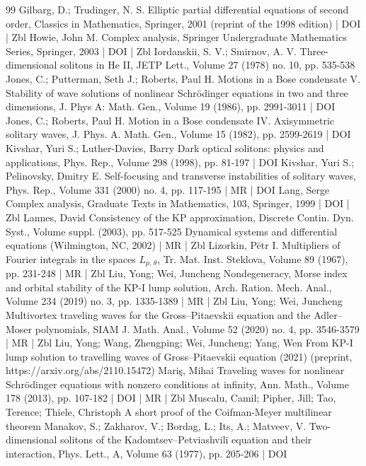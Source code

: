 \begin{thebibliography}{99}
Gilbarg, D.; Trudinger, N. S. Elliptic partial differential equations of second order, Classics in Mathematics, Springer, 2001 (reprint of the 1998 edition) | DOI | Zbl
Howie, John M. Complex analysis, Springer Undergraduate Mathematics Series, Springer, 2003 | DOI | Zbl
Iordanskii, S. V.; Smirnov, A. V. Three-dimensional solitons in He II, JETP Lett., Volume 27 (1978) no. 10, pp. 535-538
Jones, C.; Putterman, Seth J.; Roberts, Paul H. Motions in a Bose condensate V. Stability of wave solutions of nonlinear Schrödinger equations in two and three dimensions, J. Phys A: Math. Gen., Volume 19 (1986), pp. 2991-3011 | DOI
Jones, C.; Roberts, Paul H. Motion in a Bose condensate IV. Axisymmetric solitary waves, J. Phys. A. Math. Gen., Volume 15 (1982), pp. 2599-2619 | DOI
Kivshar, Yuri S.; Luther-Davies, Barry Dark optical solitons: physics and applications, Phys. Rep., Volume 298 (1998), pp. 81-197 | DOI
Kivshar, Yuri S.; Pelinovsky, Dmitry E. Self-focusing and transverse instabilities of solitary waves, Phys. Rep., Volume 331 (2000) no. 4, pp. 117-195 | MR | DOI
Lang, Serge Complex analysis, Graduate Texts in Mathematics, 103, Springer, 1999 | DOI | Zbl
Lannes, David Consistency of the KP approximation, Discrete Contin. Dyn. Syst., Volume suppl. (2003), pp. 517-525 Dynamical systems and differential equations (Wilmington, NC, 2002) | MR | Zbl
Lizorkin, Pëtr I. Multipliers of Fourier integrals in the spaces ${L}_{p,\,\theta }$, Tr. Mat. Inst. Steklova, Volume 89 (1967), pp. 231-248 | MR | Zbl
Liu, Yong; Wei, Juncheng Nondegeneracy, Morse index and orbital stability of the KP-I lump solution, Arch. Ration. Mech. Anal., Volume 234 (2019) no. 3, pp. 1335-1389 | MR | Zbl
Liu, Yong; Wei, Juncheng Multivortex traveling waves for the Gross–Pitaevskii equation and the Adler–Moser polynomials, SIAM J. Math. Anal., Volume 52 (2020) no. 4, pp. 3546-3579 | MR | Zbl
Liu, Yong; Wang, Zhengping; Wei, Juncheng; Yang, Wen From KP-I lump solution to travelling waves of Gross–Pitaevskii equation (2021) (preprint, https://arxiv.org/abs/2110.15472)
Mariş, Mihai Traveling waves for nonlinear Schrödinger equations with nonzero conditions at infinity, Ann. Math., Volume 178 (2013), pp. 107-182 | DOI | MR | Zbl
Muscalu, Camil; Pipher, Jill; Tao, Terence; Thiele, Christoph A short proof of the Coifman-Meyer multilinear theorem
Manakov, S.; Zakharov, V.; Bordag, L.; Its, A.; Matveev, V. Two-dimensional solitons of the Kadomtsev–Petviashvili equation and their interaction, Phys. Lett., A, Volume 63 (1977), pp. 205-206 | DOI

\end{thebibliography}
